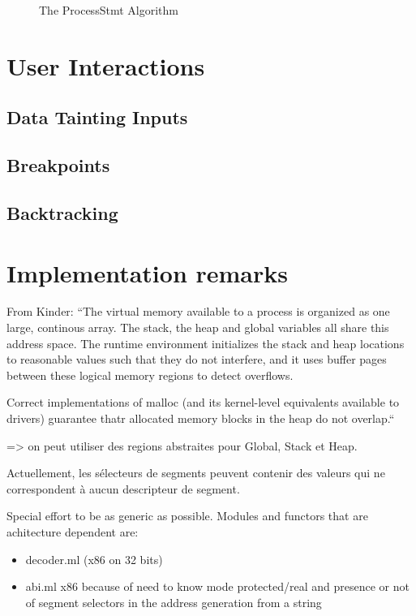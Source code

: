 \documentclass{report}
\begin{document}
\begin{figure}
\begin{algorithm}[H]
\end{algorithm}
\caption{The ProcessStmt Algorithm}
\label{algo:processStmt}
\end{figure}
\chapter{User Interactions}
\section{Data Tainting Inputs}
\section{Breakpoints}
\section{Backtracking}

\chapter{Implementation remarks}

From Kinder:
``The virtual memory available to a process is organized as one large,
continous array. The stack, the heap and global variables all share
this address space. The runtime environment initializes the stack and
heap locations to reasonable values such that they do not interfere,
and it uses buffer pages between these logical memory regions to
detect overflows.

Correct implementations of malloc (and its kernel-level equivalents
available to drivers) guarantee thatr allocated memory blocks in the
heap do not overlap.``

=> on peut utiliser des regions abstraites pour Global, Stack et Heap.

Actuellement, les sélecteurs de segments peuvent contenir des valeurs
qui ne correspondent à aucun descripteur de segment.

Special effort to be as generic as possible.
Modules and functors that are achitecture dependent are:
\begin{itemize}
\item decoder.ml (x86 on 32 bits)
\item abi.ml x86 because of need to know mode protected/real and
  presence or not of segment selectors in the address generation from
  a string
\end{itemize}
\end{document}
